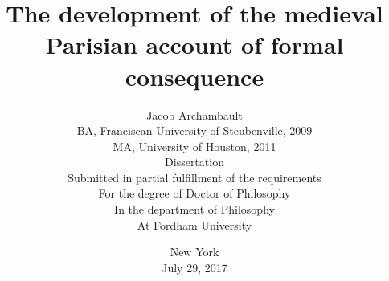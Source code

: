 \documentclass[a4paper,12pt,openany]{book}
\begin{document}
\author{Jacob Archambault \\
BA, Franciscan University of Steubenville, 2009 \\
MA, University of Houston, 2011 \\ Dissertation \\Submitted in partial fulfillment of the requirements \\For the degree of Doctor of Philosophy \\In the department of Philosophy \\At Fordham University}
\title{The development of the medieval Parisian account of formal consequence}
\date{New York \\ July 29, 2017}
\maketitle

\tableofcontents

\mainmatter






\printbibliography
\appendix




\backmatter


\end{document}
